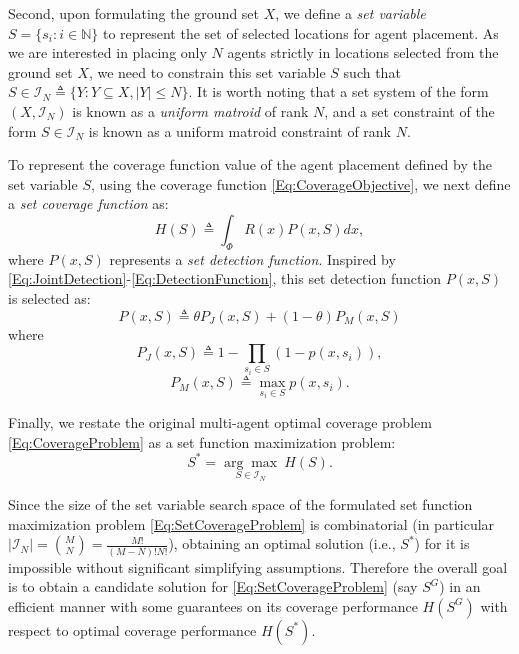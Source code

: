 \documentclass[letterpaper, 10 pt, conference]{ieeeconf}
\newcommand{\N}{\mathbb{N}}
\begin{document}
Second, upon formulating the ground set $X$, we define a \emph{set variable} $S = \{s_i:i\in\N\}$ to represent the set of selected locations for agent placement. As we are interested in placing only $N$ agents strictly in locations selected from the ground set $X$, we need to constrain this set variable $S$ such that $S \in \mathcal{I}_N \triangleq \{Y: Y \subseteq X, \vert Y \vert \leq N\}$. It is worth noting that a set system of the form $(X,\mathcal{I}_N)$ is known as a \emph{uniform matroid} of rank $N$, and a set constraint of the form $S\in\mathcal{I}_N$ is known as a uniform matroid constraint of rank $N$. 

To represent the coverage function value of the agent placement defined by the set variable $S$, using the coverage function \eqref{Eq:CoverageObjective}, we next define a \emph{set coverage function} as: 
\begin{equation}\label{Eq:SetCoverageFunction}
    H(S) \triangleq \int_\Phi R(x)P(x,S)dx,
\end{equation}
where $P(x,S)$ represents a \emph{set detection function}. Inspired by \eqref{Eq:JointDetection}-\eqref{Eq:DetectionFunction}, this set detection function $P(x,S)$ is selected as:
\begin{equation}\label{Eq:SetDetectionFunction}
P(x,S) \triangleq \theta P_J(x,S) + (1-\theta)P_M(x,S)
\end{equation}
where 
\begin{equation}\label{Eq:SetJointDetection}
P_J(x,S) \triangleq 1-\prod_{s_i\in S}(1-p(x,s_i)),
\end{equation}
\begin{equation}\label{Eq:SetMaxDetection}
P_M(x,S) \triangleq \max_{s_i\in S} p(x,s_i).    
\end{equation}


Finally, we restate the original multi-agent optimal coverage problem \eqref{Eq:CoverageProblem} as a set function maximization problem:
\begin{equation}\label{Eq:SetCoverageProblem}
S^* = \underset{S\in\mathcal{I}_N}{\arg\max}\ H(S).
\end{equation}

Since the size of the set variable search space of the formulated set function maximization problem \eqref{Eq:SetCoverageProblem} is combinatorial (in particular $\vert \mathcal{I}_N \vert = {M \choose N} =  \frac{M!}{(M-N)!N!}$), obtaining an optimal solution (i.e., $S^*$) for it is impossible without significant simplifying assumptions. Therefore the overall goal is to obtain a candidate solution for \eqref{Eq:SetCoverageProblem} (say $S^G$) in an efficient manner with some guarantees on its coverage performance $H(S^G)$ with respect to optimal coverage performance $H(S^*)$. 
\end{document}
